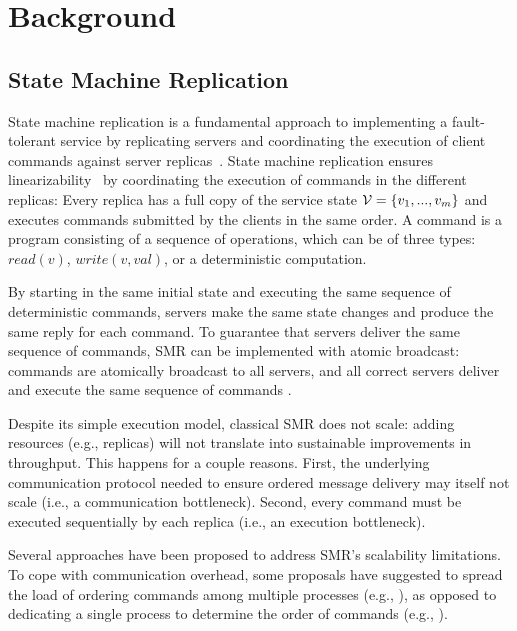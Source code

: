 \section{Background}

\subsection{State Machine Replication}
\label{sec:smr}

State machine replication is a fundamental approach to implementing a fault-tolerant service by replicating servers and coordinating the execution of client commands against server replicas~\cite{Lam78,Sch90}. 
State machine replication ensures linearizability~\cite{Attiya04} by coordinating the execution of commands in the different replicas: Every replica has a full copy of the service state $\mathcal{V} = \{v_1, ..., v_m\}$ and executes commands submitted by the clients in the same order. A command is a program consisting of a sequence of operations, which can be of three types: $read(v)$, $write(v, val)$, or a deterministic computation.

By starting in the same initial state and executing the same sequence of deterministic commands, servers make the same state changes and produce the same reply for each command. To guarantee that servers deliver the same sequence of commands, SMR can be implemented with atomic broadcast: commands are atomically broadcast to all servers, and all correct servers deliver and execute the same sequence of commands \cite{BJ87b,DSU04}.

Despite its simple execution model, classical SMR does not scale: adding resources (e.g., replicas) will not translate into sustainable improvements in throughput. This happens for a couple reasons. First, the underlying communication protocol needed to ensure ordered message delivery may itself not scale (i.e., a communication bottleneck). Second, every command must be executed sequentially by each replica (i.e., an execution bottleneck).

Several approaches have been proposed to address SMR's scalability limitations. To cope with communication overhead, some proposals have suggested to spread the load of ordering commands among multiple processes (e.g., \cite{Moraru:2013gw,Mencius,Marandi:2012hb}), as opposed to dedicating a single process to determine the order of commands (e.g., \cite{Lamport:1998ea}).%

